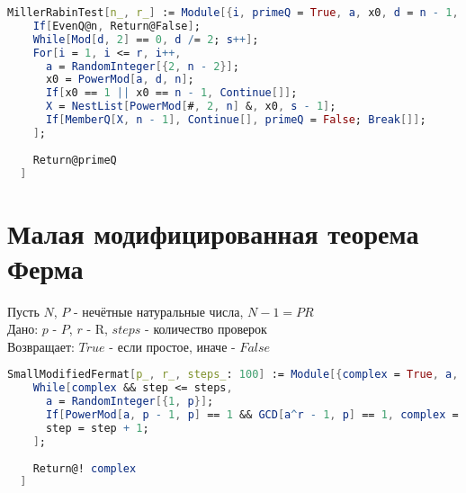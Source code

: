 \begin{lstlisting}[language=Mathematica,caption={
  Улучшенный тест Миллера-Рабина  
}]
  MillerRabinTest[n_, r_] := Module[{i, primeQ = True, a, x0, d = n - 1, s = 0, X},
    If[EvenQ@n, Return@False];
    While[Mod[d, 2] == 0, d /= 2; s++];
    For[i = 1, i <= r, i++,
      a = RandomInteger[{2, n - 2}];
      x0 = PowerMod[a, d, n];
      If[x0 == 1 || x0 == n - 1, Continue[]];
      X = NestList[PowerMod[#, 2, n] &, x0, s - 1];
      If[MemberQ[X, n - 1], Continue[], primeQ = False; Break[]];
    ];
    
    Return@primeQ
  ] 
\end{lstlisting}

\section{Малая модифицированная теорема Ферма}

  Пусть {$N$}, {$P$} - нечётные натуральные числа, {$N-1 = PR$} \\
  Дано: {$p$} - {$P$}, {$r$} - R, {$steps$} - количество проверок \\
  Возвращает: {$True$} - если простое, иначе - {$False$}

\begin{lstlisting}[language=Mathematica,caption={
  Малая модифицированная теорема Ферма  
}]
  SmallModifiedFermat[p_, r_, steps_: 100] := Module[{complex = True, a, step = 0},
    While[complex && step <= steps,
      a = RandomInteger[{1, p}];
      If[PowerMod[a, p - 1, p] == 1 && GCD[a^r - 1, p] == 1, complex = False];
      step = step + 1;
    ];
    
    Return@! complex
  ] 
\end{lstlisting}